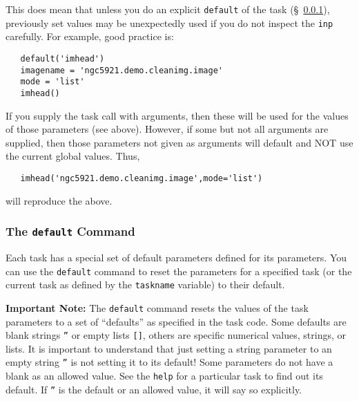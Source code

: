 This does mean that unless you do an explicit {\tt default} of the task
(\S~\ref{section:intro.tasks.setpar.default}), previously set values
may be unexpectedly used if you do not inspect the {\tt inp}
carefully.  For example, good practice is:
\small
\begin{verbatim}
   default('imhead')
   imagename = 'ngc5921.demo.cleanimg.image'
   mode = 'list'
   imhead()
\end{verbatim}
\normalsize

If you supply the task call with arguments, then these will be used
for the values of those parameters (see above).  However, if some but
not all arguments are supplied, then those parameters not given as
arguments will default and NOT use the current global values.  Thus,
\small
\begin{verbatim}
   imhead('ngc5921.demo.cleanimg.image',mode='list')
\end{verbatim}
\normalsize
will reproduce the above.

\subsubsection{The {\tt default} Command}
\label{section:intro.tasks.setpar.default}

Each task has a special set of default parameters defined for its
parameters.  You can use the {\tt default} command to reset the
parameters for a specified task (or the current task as defined
by the {\tt taskname} variable) to their default. 

{\bf Important Note:} The {\tt default} command resets the values
of the task parameters to a set of ``defaults'' as specified in
the task code.  Some defaults are blank strings {\tt ''} or 
empty lists {\tt []}, others are specific numerical values, strings,
or lists.  It is important to understand that just setting a string
parameter to an empty string {\tt ''} is not setting it to its 
default!  Some parameters do not have a blank as an allowed value.
See the {\tt help} for a particular task to find out its default.
If {\tt ''} is the default or an allowed value, it will say so
explicitly.

